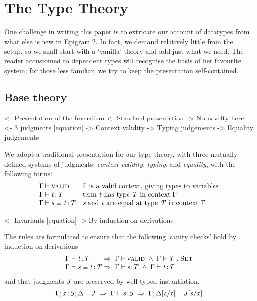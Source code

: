 
\section{The Type Theory}
\label{sec:type-theory}

One challenge in writing this paper is to extricate our account of datatypes from what else is new in Epigram 2. In fact, we demand relatively little from the setup, so we shall start with a `vanilla' theory and add just what we need. The reader accustomed to dependent types will recognise the basis of her favourite system; for those less familiar, we try to keep the presentation self-contained.

\subsection{Base theory}

\begin{wstructure}
<- Presentation of the formalism
    <- Standard presentation
        -> No novelty here
    <- 3 judgments [equation]
        -> Context validity
        -> Typing judgements
        -> Equality judgements
\end{wstructure}

We adopt a traditional presentation for our type
theory, with three mutually defined systems of judgments:
\emph{context validity}, \emph{typing}, and \emph{equality},
with the following forms:
%
\[
\begin{array}{ll}
\Gamma \vdash \textsc{valid}                & \mbox{\(\Gamma\) is a valid context, giving types to variables} \\
\Gamma \vdash \mathit{t}\!:\!\mathit{T}           & \mbox{term \(\mathit{t}\) has type \(\mathit{T}\) in context \(\Gamma\)} \\
\Gamma \vdash \mathit{s} \equiv \mathit{t}\!:\!\mathit{T}  & \mbox{\(\mathit{s}\) and \(\mathit{t}\) are equal at type \(\mathit{T}\) in context \(\Gamma\)} \\
\end{array}
\]

\begin{wstructure}
    <- Invariants [equation]
        -> By induction on derivations
\end{wstructure}

The rules are formulated to ensure that the
following `sanity checks' hold by induction on derivations
%
\[
\begin{array}{l@{\;\Rightarrow\;\;}l}
\G            \vdash \Bhab{\M{t}}{\M{T}}            
    & \G \vdash \Valid\; \wedge\; \G\vdash\Type{\M{T}} \\
\G            \vdash s \equiv \Bhab{\M{t}}{\M{T}}   
    & \G \vdash \Bhab{s}{T} \;\wedge\; \G\vdash \Bhab{\M{t}}{\M{T}}
\end{array} \]
%
and that judgments \(\mathit{J}\) are preserved by well-typed instantiation.
%
\[
\G ; \xS ; \Delta \vdash \M{J}            \;\Rightarrow\;      
    \G \vdash \Bhab{\M{s}}{\M{S}} \;\Rightarrow\; 
          \G ; \Delta[\M{s}/\x] \vdash \M{J}[\M{s}/\x] 
\]

